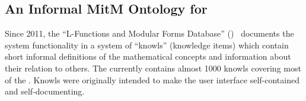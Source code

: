 %
%
%
%
%

\subsection{An Informal MitM Ontology for  \LMFDB}\label{sec:knowls}

Since 2011, the ``L-Functions and Modular Forms Database'' (\LMFDB)~\cite{Cremona:LMFDB16,lmfdb:on} documents the system functionality in a system of ``knowls'' (knowledge items) which contain short informal definitions of the mathematical concepts and information about their relation to others.
The \LMFDB currently contains almost 1000 knowls covering most of the \LMFDB.
Knowls were originally intended to make the \LMFDB user interface self-contained and self-documenting.

